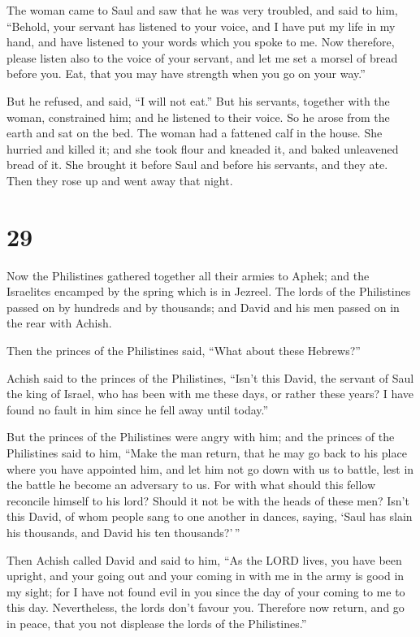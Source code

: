  The woman came to Saul and saw that he was very
troubled, and said to him, ``Behold, your servant has listened to your
voice, and I have put my life in my hand, and have listened to your
words which you spoke to me.  Now therefore, please
listen also to the voice of your servant, and let me set a morsel of
bread before you. Eat, that you may have strength when you go on your
way.''

 But he refused, and said, ``I will not eat.'' But his
servants, together with the woman, constrained him; and he listened to
their voice. So he arose from the earth and sat on the bed.
 The woman had a fattened calf in the house. She hurried
and killed it; and she took flour and kneaded it, and baked unleavened
bread of it.  She brought it before Saul and before his
servants, and they ate. Then they rose up and went away that night.

\hypertarget{section-28}{%
\section{29}\label{section-28}}

 Now the Philistines gathered together all their armies to
Aphek; and the Israelites encamped by the spring which is in Jezreel.
 The lords of the Philistines passed on by hundreds and by
thousands; and David and his men passed on in the rear with Achish.

 Then the princes of the Philistines said, ``What about
these Hebrews?''

Achish said to the princes of the Philistines, ``Isn't this David, the
servant of Saul the king of Israel, who has been with me these days, or
rather these years? I have found no fault in him since he fell away
until today.''

 But the princes of the Philistines were angry with him;
and the princes of the Philistines said to him, ``Make the man return,
that he may go back to his place where you have appointed him, and let
him not go down with us to battle, lest in the battle he become an
adversary to us. For with what should this fellow reconcile himself to
his lord? Should it not be with the heads of these men? 
Isn't this David, of whom people sang to one another in dances, saying,
`Saul has slain his thousands, and David his ten thousands?'\,''

 Then Achish called David and said to him, ``As the LORD
lives, you have been upright, and your going out and your coming in with
me in the army is good in my sight; for I have not found evil in you
since the day of your coming to me to this day. Nevertheless, the lords
don't favour you.  Therefore now return, and go in peace,
that you not displease the lords of the Philistines.''

